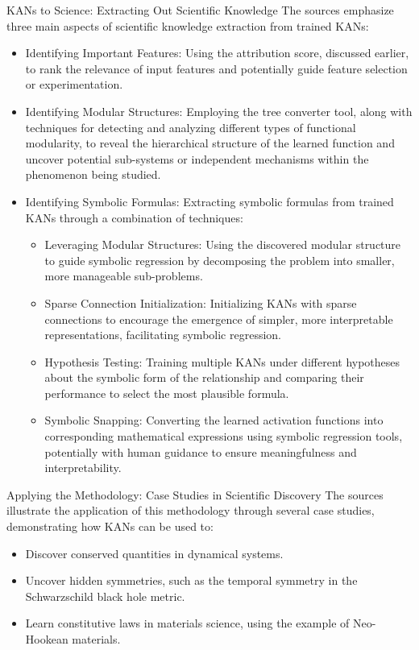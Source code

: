 KANs to Science: Extracting Out Scientific Knowledge The sources emphasize
three main aspects of scientific knowledge extraction from trained KANs:
\begin{itemize}
    \item Identifying Important Features: Using the attribution score, discussed earlier,
          to rank the relevance of input features and potentially guide feature selection
          or experimentation.
    \item Identifying Modular Structures: Employing the tree converter tool, along with
          techniques for detecting and analyzing different types of functional
          modularity, to reveal the hierarchical structure of the learned function and
          uncover potential sub-systems or independent mechanisms within the phenomenon
          being studied.
    \item Identifying Symbolic Formulas: Extracting symbolic formulas from trained KANs
          through a combination of techniques:
          \begin{itemize}
              \item Leveraging Modular Structures: Using the discovered modular structure to guide
                    symbolic regression by decomposing the problem into smaller, more manageable
                    sub-problems.
              \item Sparse Connection Initialization: Initializing KANs with sparse connections to
                    encourage the emergence of simpler, more interpretable representations,
                    facilitating symbolic regression.
              \item Hypothesis Testing: Training multiple KANs under different hypotheses about the
                    symbolic form of the relationship and comparing their performance to select the
                    most plausible formula.
              \item Symbolic Snapping: Converting the learned activation functions into
                    corresponding mathematical expressions using symbolic regression tools,
                    potentially with human guidance to ensure meaningfulness and interpretability.
          \end{itemize}
\end{itemize}

Applying the Methodology: Case Studies in Scientific Discovery The sources
illustrate the application of this methodology through several case studies,
demonstrating how KANs can be used to:
\begin{itemize}
    \item Discover conserved quantities in dynamical systems.
    \item Uncover hidden symmetries, such as the temporal symmetry in the Schwarzschild
          black hole metric.
    \item Learn constitutive laws in materials science, using the example of Neo-Hookean
          materials.
\end{itemize}


